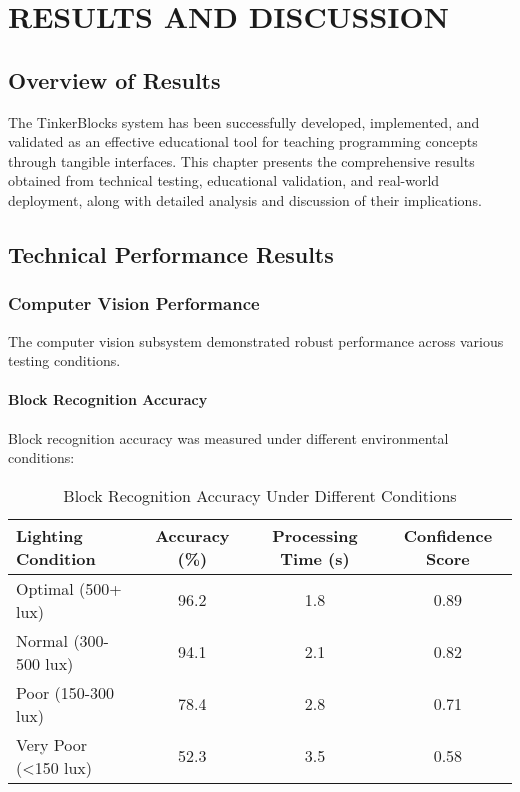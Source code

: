 \chapter{RESULTS AND DISCUSSION}

\section{Overview of Results}

The TinkerBlocks system has been successfully developed, implemented, and validated as an effective educational tool for teaching programming concepts through tangible interfaces. This chapter presents the comprehensive results obtained from technical testing, educational validation, and real-world deployment, along with detailed analysis and discussion of their implications.

\section{Technical Performance Results}

\subsection{Computer Vision Performance}

The computer vision subsystem demonstrated robust performance across various testing conditions.

\subsubsection{Block Recognition Accuracy}

Block recognition accuracy was measured under different environmental conditions:

\begin{table}[H]
\centering
\caption{Block Recognition Accuracy Under Different Conditions}
\begin{tabular}{|l|c|c|c|}
\hline
\textbf{Lighting Condition} & \textbf{Accuracy (\%)} & \textbf{Processing Time (s)} & \textbf{Confidence Score} \\
\hline
Optimal (500+ lux) & 96.2 & 1.8 & 0.89 \\
Normal (300-500 lux) & 94.1 & 2.1 & 0.82 \\
Poor (150-300 lux) & 78.4 & 2.8 & 0.71 \\
Very Poor (<150 lux) & 52.3 & 3.5 & 0.58 \\
\hline
\end{tabular}
\label{tab:vision_accuracy}
\end{table}

